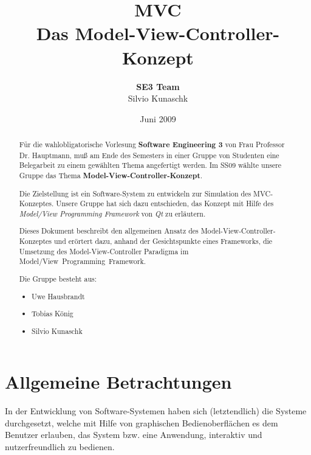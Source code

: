 \documentclass[11pt,a4paper,titlepage]{scrreprt}
\begin{document}
\selectlanguage{\german}

\title{{\Huge \bf MVC}\\[0.55em]{\LARGE Das Model-View-Controller-Konzept}}
\author{{\bf SE3 Team}\\Silvio Kunaschk}

\date{Juni 2009}
\maketitle

\begin{abstract}
Für die wahlobligatorische Vorlesung {\bf Software Engineering 3} von
Frau Professor Dr. Hauptmann, muß am Ende des Semesters in einer 
Gruppe von Studenten eine Belegarbeit zu einem gewählten Thema
angefertigt werden. Im SS09 wählte unsere Gruppe das Thema
{\bf Model-View-Controller-Konzept}.\\{\smallskip}

Die Zielstellung ist ein Software-System zu entwickeln zur Simulation
des MVC-Konzeptes. Unsere Gruppe hat sich dazu entschieden, das Konzept
mit Hilfe des {\itshape Model/View Programming Framework} von {\itshape Qt}
zu erläutern.\\{\smallskip}

Dieses Dokument beschreibt den allgemeinen Ansatz des 
Model-View-Controller-Konzeptes und erörtert dazu, anhand der Gesichtspunkte
eines Frameworks, die Umsetzung des Model-View-Controller Paradigma im
Model/View~Programming~Framework.\\{\bigskip}

Die Gruppe besteht aus:
\begin{itemize}
\item Uwe Hausbrandt
\item Tobias König
\item Silvio Kunaschk
\end{itemize}

\end{abstract}

\tableofcontents

\chapter{Allgemeine Betrachtungen}
In der Entwicklung von Software-Systemen haben sich (letztendlich) die Systeme durchgesetzt, 
welche mit Hilfe von graphischen Bedienoberflächen es dem Benutzer erlauben, das System
bzw. eine Anwendung, interaktiv und nutzerfreundlich zu bedienen.\\
\end{document}
